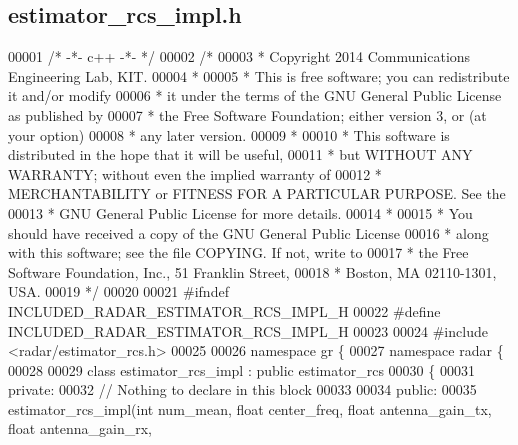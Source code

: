\subsection{estimator\+\_\+rcs\+\_\+impl.\+h}
\label{estimator__rcs__impl_8h_source}

\begin{DoxyCode}
00001 \textcolor{comment}{/* -*- c++ -*- */}
00002 \textcolor{comment}{/* }
00003 \textcolor{comment}{ * Copyright 2014 Communications Engineering Lab, KIT.}
00004 \textcolor{comment}{ * }
00005 \textcolor{comment}{ * This is free software; you can redistribute it and/or modify}
00006 \textcolor{comment}{ * it under the terms of the GNU General Public License as published by}
00007 \textcolor{comment}{ * the Free Software Foundation; either version 3, or (at your option)}
00008 \textcolor{comment}{ * any later version.}
00009 \textcolor{comment}{ * }
00010 \textcolor{comment}{ * This software is distributed in the hope that it will be useful,}
00011 \textcolor{comment}{ * but WITHOUT ANY WARRANTY; without even the implied warranty of}
00012 \textcolor{comment}{ * MERCHANTABILITY or FITNESS FOR A PARTICULAR PURPOSE.  See the}
00013 \textcolor{comment}{ * GNU General Public License for more details.}
00014 \textcolor{comment}{ * }
00015 \textcolor{comment}{ * You should have received a copy of the GNU General Public License}
00016 \textcolor{comment}{ * along with this software; see the file COPYING.  If not, write to}
00017 \textcolor{comment}{ * the Free Software Foundation, Inc., 51 Franklin Street,}
00018 \textcolor{comment}{ * Boston, MA 02110-1301, USA.}
00019 \textcolor{comment}{ */}
00020 
00021 \textcolor{preprocessor}{#ifndef INCLUDED\_RADAR\_ESTIMATOR\_RCS\_IMPL\_H}
00022 \textcolor{preprocessor}{#define INCLUDED\_RADAR\_ESTIMATOR\_RCS\_IMPL\_H}
00023 
00024 \textcolor{preprocessor}{#include <radar/estimator_rcs.h>}
00025 
00026 \textcolor{keyword}{namespace }gr \{
00027   \textcolor{keyword}{namespace }radar \{
00028 
00029     \textcolor{keyword}{class }estimator_rcs_impl : \textcolor{keyword}{public} estimator_rcs
00030     \{
00031      \textcolor{keyword}{private}:
00032       \textcolor{comment}{// Nothing to declare in this block}
00033 
00034      \textcolor{keyword}{public}:
00035       estimator_rcs_impl(\textcolor{keywordtype}{int} num\_mean, \textcolor{keywordtype}{float} center_freq, \textcolor{keywordtype}{float} antenna\_gain\_tx, \textcolor{keywordtype}{float} antenna\_gain\_rx, \textcolor{keywordtype}{
}
\end{DoxyCode}
